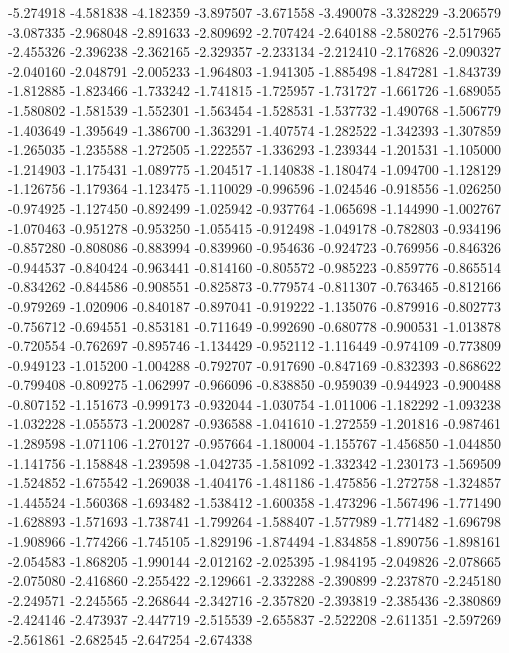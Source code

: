 -5.274918
-4.581838
-4.182359
-3.897507
-3.671558
-3.490078
-3.328229
-3.206579
-3.087335
-2.968048
-2.891633
-2.809692
-2.707424
-2.640188
-2.580276
-2.517965
-2.455326
-2.396238
-2.362165
-2.329357
-2.233134
-2.212410
-2.176826
-2.090327
-2.040160
-2.048791
-2.005233
-1.964803
-1.941305
-1.885498
-1.847281
-1.843739
-1.812885
-1.823466
-1.733242
-1.741815
-1.725957
-1.731727
-1.661726
-1.689055
-1.580802
-1.581539
-1.552301
-1.563454
-1.528531
-1.537732
-1.490768
-1.506779
-1.403649
-1.395649
-1.386700
-1.363291
-1.407574
-1.282522
-1.342393
-1.307859
-1.265035
-1.235588
-1.272505
-1.222557
-1.336293
-1.239344
-1.201531
-1.105000
-1.214903
-1.175431
-1.089775
-1.204517
-1.140838
-1.180474
-1.094700
-1.128129
-1.126756
-1.179364
-1.123475
-1.110029
-0.996596
-1.024546
-0.918556
-1.026250
-0.974925
-1.127450
-0.892499
-1.025942
-0.937764
-1.065698
-1.144990
-1.002767
-1.070463
-0.951278
-0.953250
-1.055415
-0.912498
-1.049178
-0.782803
-0.934196
-0.857280
-0.808086
-0.883994
-0.839960
-0.954636
-0.924723
-0.769956
-0.846326
-0.944537
-0.840424
-0.963441
-0.814160
-0.805572
-0.985223
-0.859776
-0.865514
-0.834262
-0.844586
-0.908551
-0.825873
-0.779574
-0.811307
-0.763465
-0.812166
-0.979269
-1.020906
-0.840187
-0.897041
-0.919222
-1.135076
-0.879916
-0.802773
-0.756712
-0.694551
-0.853181
-0.711649
-0.992690
-0.680778
-0.900531
-1.013878
-0.720554
-0.762697
-0.895746
-1.134429
-0.952112
-1.116449
-0.974109
-0.773809
-0.949123
-1.015200
-1.004288
-0.792707
-0.917690
-0.847169
-0.832393
-0.868622
-0.799408
-0.809275
-1.062997
-0.966096
-0.838850
-0.959039
-0.944923
-0.900488
-0.807152
-1.151673
-0.999173
-0.932044
-1.030754
-1.011006
-1.182292
-1.093238
-1.032228
-1.055573
-1.200287
-0.936588
-1.041610
-1.272559
-1.201816
-0.987461
-1.289598
-1.071106
-1.270127
-0.957664
-1.180004
-1.155767
-1.456850
-1.044850
-1.141756
-1.158848
-1.239598
-1.042735
-1.581092
-1.332342
-1.230173
-1.569509
-1.524852
-1.675542
-1.269038
-1.404176
-1.481186
-1.475856
-1.272758
-1.324857
-1.445524
-1.560368
-1.693482
-1.538412
-1.600358
-1.473296
-1.567496
-1.771490
-1.628893
-1.571693
-1.738741
-1.799264
-1.588407
-1.577989
-1.771482
-1.696798
-1.908966
-1.774266
-1.745105
-1.829196
-1.874494
-1.834858
-1.890756
-1.898161
-2.054583
-1.868205
-1.990144
-2.012162
-2.025395
-1.984195
-2.049826
-2.078665
-2.075080
-2.416860
-2.255422
-2.129661
-2.332288
-2.390899
-2.237870
-2.245180
-2.249571
-2.245565
-2.268644
-2.342716
-2.357820
-2.393819
-2.385436
-2.380869
-2.424146
-2.473937
-2.447719
-2.515539
-2.655837
-2.522208
-2.611351
-2.597269
-2.561861
-2.682545
-2.647254
-2.674338
